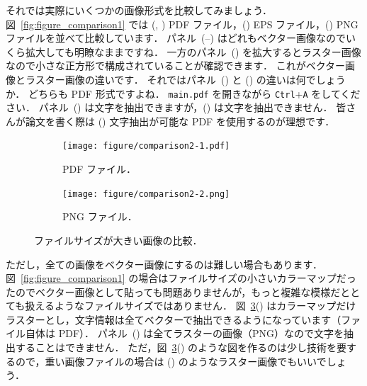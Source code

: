 それでは実際にいくつかの画像形式を比較してみましょう．
図~\ref{fig:figure_comparison1} では (, ) PDF ファイル，() EPS ファイル，() PNG ファイルを並べて比較しています．
パネル~(--) はどれもベクター画像なのでいくら拡大しても明瞭なままですね．
一方のパネル~() を拡大するとラスター画像なので小さな正方形で構成されていることが確認できます．
これがベクター画像とラスター画像の違いです．
それではパネル~() と () の違いは何でしょうか．
どちらも PDF 形式ですよね．
\verb|main.pdf| を開きながら \verb|Ctrl|+\verb|A| をしてください．
パネル~() は文字を抽出できますが，() は文字を抽出できません．
皆さんが論文を書く際は () 文字抽出が可能な PDF を使用するのが理想です．

\begin{figure}[tp]
    \centering
    \begin{subfigure}{0.45\columnwidth}
        \centering
        \texttt{[image: figure/comparison2-1.pdf]}
        \caption{PDF ファイル．}
        \label{subfig:figcomp2_pdf}
    \end{subfigure}
    \hspace{3mm} %
    \begin{subfigure}{0.45\columnwidth}
        \centering
        \texttt{[image: figure/comparison2-2.png]}
        \caption{PNG ファイル．}
        \label{subfig:figcomp2_png}
    \end{subfigure}
    \caption{ファイルサイズが大きい画像の比較．}
    \label{fig:figure_comparison2}
\end{figure}

ただし，全ての画像をベクター画像にするのは難しい場合もあります．
図~\ref{fig:figure_comparison1} の場合はファイルサイズの小さいカラーマップだったのでベクター画像として貼っても問題ありませんが，もっと複雑な模様だととても扱えるようなファイルサイズではありません．
図~\ref{fig:figure_comparison2}() はカラーマップだけラスターとし，文字情報は全てベクターで抽出できるようになっています（ファイル自体は PDF）．
パネル~() は全てラスターの画像（PNG）なので文字を抽出することはできません．
ただ，図~\ref{fig:figure_comparison2}() のような図を作るのは少し技術を要するので，重い画像ファイルの場合は () のようなラスター画像でもいいでしょう．


